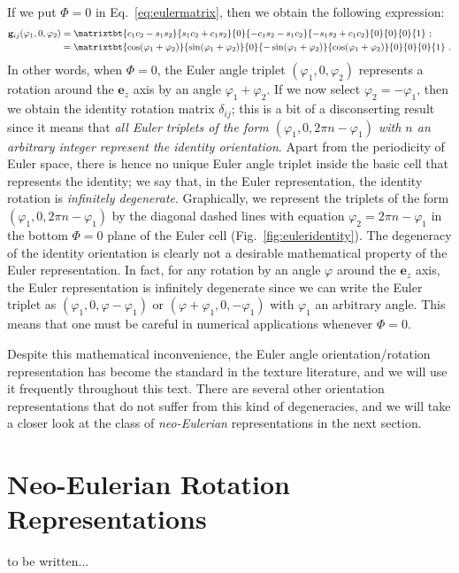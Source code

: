 If we put $\Phi=0$ in Eq.~\ref{eq:eulermatrix}, then we obtain the following expression:
\begin{align}
	\mathbf{g}_{ij}(\varphi_1,0,\varphi_2) &= \matrixtbt{c_1c_2-s_1s_2}{s_1c_2+c_1s_2}{0}
	{-c_1s_2-s_1c_2}{-s_1s_2+c_1c_2}{0}
	{0}{0}{1}\ ;\nonumber\\
	&= \matrixtbt{\cos(\varphi_1+\varphi_2)}{\sin(\varphi_1+\varphi_2)}{0} {-\sin(\varphi_1+\varphi_2)}{\cos(\varphi_1+\varphi_2)}{0} {0}{0}{1}\ .\label{eq:eulermatrix2}
\end{align}
In other words, when $\Phi=0$, the Euler angle triplet $(\varphi_1,0,\varphi_2)$ represents a rotation around the $\mathbf{e}_z$ axis by an angle $\varphi_1+\varphi_2$.  If we now select $\varphi_2=-\varphi_1$, then we obtain the identity rotation matrix $\delta_{ij}$; this is a bit of a disconserting result since it means that \textit{all Euler triplets of the form $(\varphi_1,0,2\pi n-\varphi_1)$ with $n$ an arbitrary integer represent the identity orientation}.  Apart from the periodicity of Euler space, there is hence no unique Euler angle triplet inside the basic cell that represents the identity; we say that, in the Euler representation, the identity rotation is \textit{infinitely degenerate}.  Graphically, we represent the triplets of the form $(\varphi_1,0,2\pi n-\varphi_1)$ by the diagonal dashed lines with equation $\varphi_2=2\pi n-\varphi_1$ in the bottom $\Phi=0$ plane of the Euler cell (Fig.~\ref{fig:euleridentity}).  The degeneracy of the identity orientation is clearly not a desirable mathematical property of the Euler representation.  In fact, for any rotation by an angle $\varphi$ around the $\mathbf{e}_z$ axis, the Euler representation is infinitely degenerate since we can write the Euler triplet as $(\varphi_1,0,\varphi-\varphi_1)$ or $(\varphi+\varphi_1,0,-\varphi_1)$ with $\varphi_1$ an arbitrary angle.  This means that one must be careful in numerical applications whenever $\Phi=0$.

Despite this mathematical inconvenience, the Euler angle orientation/rotation representation has become the standard in the texture literature, and we will use it frequently throughout this text.  There are several other orientation representations that do not suffer from this kind of degeneracies, and we will take a closer look at the class of \textit{neo-Eulerian} representations in the next section.


\section{Neo-Eulerian Rotation Representations}

{\color{red}to be written...}








